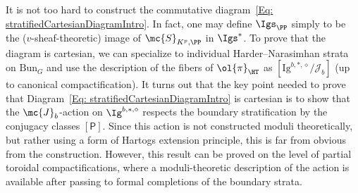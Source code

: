 \documentclass[letterpaper,11pt]{amsart}
\begin{document}
It is not too hard to construct the commutative diagram~\eqref{Eq: stratifiedCartesianDiagramIntro}. In fact, one may define $\Igs_\PP$ simply to be the ($v$-sheaf-theoretic) image of $\mc{S}_{K^p,\PP}$ in $\Igs^\ast$. To prove that the diagram is cartesian, we can specialize to individual Harder--Narasimhan strata on $\mathrm{Bun}_{G}$ and use the description of the fibers of $\ol{\pi}_{\HT}$ as $[\mathrm{Ig}^{b,*, \diamond}/\mathcal{J}_b]$ (up to canonical compactification).  It turns out that the key point needed to prove that Diagram~\eqref{Eq: stratifiedCartesianDiagramIntro} is cartesian is to show that the $\mc{J}_b$-action on $\Ig^{b,\ast,\diamond}$ respects the boundary stratification by the conjugacy classes $[\mathsf{P}]$. Since this action is not constructed moduli theoretically, but rather using a form of Hartogs extension principle, this is far from obvious from the construction. However, this result can be proved on the level of partial toroidal compactifications, where a moduli-theoretic description of the action is available after passing to formal completions of the boundary strata. 


\end{document}
